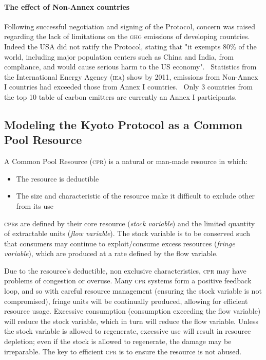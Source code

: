 \documentclass[]{article} %
\begin{document}
\paragraph{The effect of Non-Annex countries}

Following successful negotiation and signing of the Protocol, concern was raised regarding the lack of limitations on the \textsc{ghg} emissions of developing countries. Indeed the \textsc{USA} did not ratify the Protocol, stating that "it exempts 80\% of the world, including major population centers such as China and India, from compliance, and would cause serious harm to the US economy".~\cite{Hague-to-Marrakesh} Statistics from the International Energy Agency (\textsc{iea}) show by 2011, emissions from Non-Annex I countries had exceeded those from Annex I countries.~\cite{IEA-highlights} Only 3 countries from the top 10 table of carbon emitters are currently an Annex I participants.

\subsection{Modeling the Kyoto Protocol as a Common Pool Resource}

A Common Pool Resource (\textsc{cpr}) is a natural or man-made resource in which:~\cite{Ostrom-90}

\begin{itemize}
	\item The resource is deductible
	\item The size and characteristic of the resource make it difficult to exclude other from its use
\end{itemize}

\textsc{cpr}s are defined by their core resource (\emph{stock variable}) and the limited quantity of extractable units (\emph{flow variable}). The stock variable is to be conserved such that consumers may continue to exploit/consume excess resources (\emph{fringe variable}), which are produced at a rate defined by the flow variable.

Due to the resource’s deductible, non exclusive characteristics, \textsc{cpr} may have problems of congestion or overuse. Many \textsc{cpr} systems form a positive feedback loop, and so with careful resource management (ensuring the stock variable is not compromised), fringe units will be continually produced, allowing for efficient resource usage. Excessive consumption (consumption exceeding the flow variable) will reduce the stock variable, which in turn will reduce the flow variable. Unless the stock variable is allowed to regenerate, excessive use will result in resource depletion; even if the stock is allowed to regenerate, the damage may be irreparable. The key to efficient \textsc{cpr} is to ensure the resource is not abused.
\end{document}
